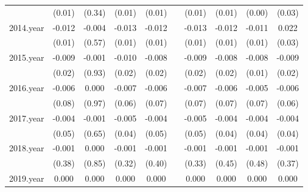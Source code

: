 {\begin{tabular}{l*{9}{c}}
          &   (0.01)         &   (0.34)         &   (0.01)         &   (0.01)         &                  &   (0.01)         &   (0.01)         &   (0.00)         &   (0.03)         \\
[1em]
2014.year &   -0.012\sym{*}  &   -0.004         &   -0.013\sym{*}  &   -0.012\sym{*}  &                  &   -0.013\sym{*}  &   -0.012\sym{*}  &   -0.011\sym{**} &    0.022\sym{*}  \\
          &   (0.01)         &   (0.57)         &   (0.01)         &   (0.01)         &                  &   (0.01)         &   (0.01)         &   (0.01)         &   (0.03)         \\
[1em]
2015.year &   -0.009\sym{*}  &   -0.001         &   -0.010\sym{*}  &   -0.008\sym{*}  &                  &   -0.009\sym{*}  &   -0.008\sym{*}  &   -0.008\sym{*}  &   -0.009\sym{*}  \\
          &   (0.02)         &   (0.93)         &   (0.02)         &   (0.02)         &                  &   (0.02)         &   (0.02)         &   (0.01)         &   (0.02)         \\
[1em]
2016.year &   -0.006         &    0.000         &   -0.007         &   -0.006         &                  &   -0.007         &   -0.006         &   -0.005         &   -0.006         \\
          &   (0.08)         &   (0.97)         &   (0.06)         &   (0.07)         &                  &   (0.07)         &   (0.07)         &   (0.07)         &   (0.06)         \\
[1em]
2017.year &   -0.004         &   -0.001         &   -0.005\sym{*}  &   -0.004\sym{*}  &                  &   -0.005         &   -0.004\sym{*}  &   -0.004\sym{*}  &   -0.004\sym{*}  \\
          &   (0.05)         &   (0.65)         &   (0.04)         &   (0.05)         &                  &   (0.05)         &   (0.04)         &   (0.04)         &   (0.04)         \\
[1em]
2018.year &   -0.001         &    0.000         &   -0.001         &   -0.001         &                  &   -0.001         &   -0.001         &   -0.001         &   -0.001         \\
          &   (0.38)         &   (0.85)         &   (0.32)         &   (0.40)         &                  &   (0.33)         &   (0.45)         &   (0.48)         &   (0.37)         \\
[1em]
2019.year &    0.000         &    0.000         &    0.000         &    0.000         &                  &    0.000         &    0.000         &    0.000         &    0.000         \\

\end{tabular}}
